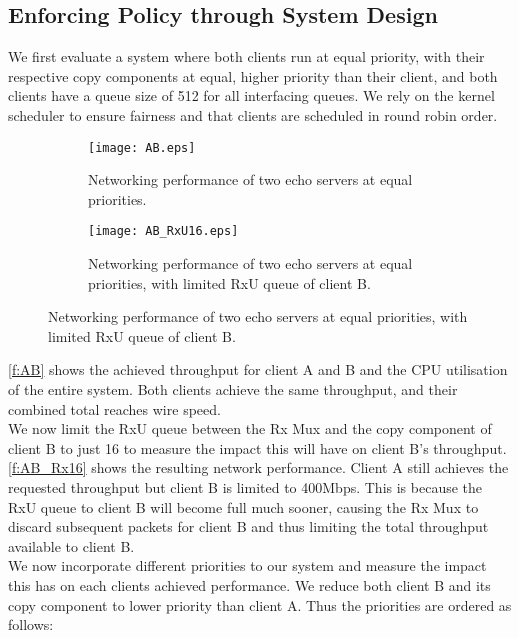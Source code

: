 \subsection{Enforcing Policy through System Design}
We first evaluate a system where both clients run at equal priority, with their respective copy components at 
equal, higher priority than their client, and both clients have a queue size of 512 for all interfacing queues.
We rely on the kernel scheduler to ensure fairness and that clients are scheduled in round robin order.

\noindent\begin{figure}[H]
    \centering
	\begin{multicols}{2}
		\begin{subfigure}[b]{0.45\textwidth}
        \centering
        \texttt{[image: AB.eps]}
        \caption{Networking performance of two echo servers at equal priorities.}
        \label{f:AB}
    \end{subfigure}\qquad
    \begin{subfigure}[b]{0.45\textwidth}
        \centering
        \texttt{[image: AB\_RxU16.eps]}
        \caption{Networking performance of two echo servers at equal priorities, with limited RxU queue of client B.}
        \label{f:AB_Rx16}
    \end{subfigure}
\end{multicols}
\end{figure}

\autoref{f:AB} shows the achieved throughput for client A and B and the CPU utilisation of the entire system. 
Both clients achieve the same throughput, and their combined total reaches wire speed.\\

We now limit the RxU queue between the Rx Mux and the copy component of client B to just 16 to measure 
the impact this will have on client B's throughput. \autoref{f:AB_Rx16} shows the resulting network performance.
Client A still achieves the requested throughput but client B is limited to 400Mbps. This is because the RxU queue
to client B will become full much sooner, causing the Rx Mux to discard subsequent packets for client B and thus
limiting the total throughput available to client B.\\

We now incorporate different priorities to our system and measure the impact this has on each clients
achieved performance. We reduce both client B and its copy component to lower priority than client A. 
Thus the priorities are ordered as follows:\\ 


